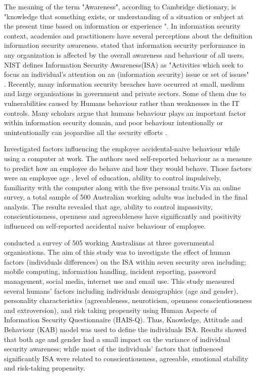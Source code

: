 The meaning of the term "Awareness", according to Cambridge dictionary, is "knowledge that something exists, or understanding of a situation or subject at the present time based on information or experience ".
In information security context, academics and practitioners have several perceptions about the definition information security awareness. \citet{Albrechtsen} stated that information security performance in any organization is affected by the overall awareness and behaviour of all users.   
NIST\cite{Kissel2013} defines Information Security Awareness(ISA) as "Activities which seek to focus an individual’s attention on an (information security) issue or set of issues" .  
Recently, many information security breaches have occurred at small, medium and large organisations in government and private sectors. Some of them due to vulnerabilities caused by Humans behaviour rather than  weaknesses in the IT controls. Many scholars argue that humans behaviour plays an important factor within information security domain, and poor behaviour intentionally or unintentionally can jeopardise all the security efforts \cite{Kruger2006,Butavicius2017,Bawazir2016,Giraldo2014,Lebek2013,McCormac2016,safa2015information,Benbasat2010a}.  

\citet{Parsons2014} Investigated factors influencing the employee accidental-naive behaviour while using a computer at work. The authors used self-reported behaviour as a measure to predict how an employee do behave and how they would behave. Those factors were an employee age , level of education, ability to control impulsively, familiarity with the computer along with the five personal traits.Via an online survey, a total sample of 500 Australian working adults was included in the final analysis. The results revealed that age, ability to control impassivity, conscientiousness, openness  and agreeableness have significantly and positivity influenced on self-reported accidental naive behaviour of employee.

\citet{McCormac2016} conducted a survey of 505 working Australians at three governmental organisations. The aim of this study was to investigate the effect of human factors (individuals differences) on the ISA within seven security area including; mobile computing, information handling, incident reporting, password management, social media, internet use and email use. This study measured several humans' factors including individuals demographics (age and gender), personality characteristics (agreeableness, neuroticism, openness conscientiousness and extroversion), and risk taking propensity using Human Aspects of Information Security Questionnaire (HAIS-Q). Thus, Knowledge, Attitude and Behaviour (KAB) model was used to define the individuals ISA. Results showed that both age and gender had a small impact on the variance of individual security awareness; while most of the individuals' factors that  influenced significantly ISA were related to conscientiousness, agreeable, emotional stability and risk-taking propensity.

